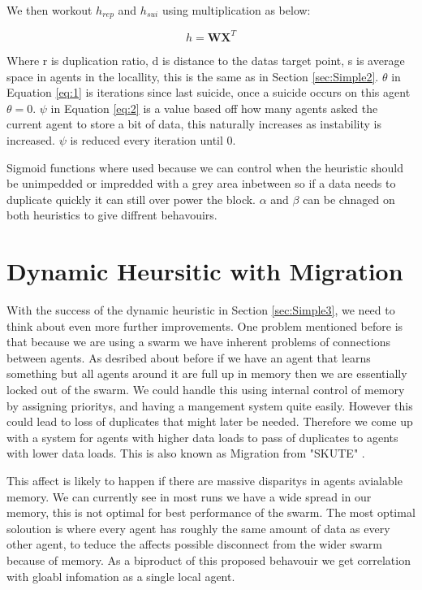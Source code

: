\documentclass{UoYCSproject}
\begin{document}
We then workout $h_{rep}$ and $h_{sui}$ using multiplication as below:

\begin{equation}
 h  = \textbf{W}  \textbf{X} ^{T} 
\end{equation}

Where r is duplication ratio, d is distance to the datas target point, s is average space in agents in the locallity, this is the same as in Section \ref{sec:Simple2}.
$\theta$ in Equation \ref{eq:1} is iterations since last suicide, once a suicide occurs on this agent $\theta=0$.
$\psi$ in Equation \ref{eq:2} is a value based off how many agents asked the current agent to store a bit of data, this naturally increases as instability is increased.
$\psi$ is reduced every iteration until 0.

Sigmoid functions where used because we can control when the heuristic should be unimpedded or impredded with a grey area inbetween so if a data needs to duplicate quickly it can still over power the block.
$\alpha$ and $\beta$ can be chnaged on both heuristics to give diffrent behavouirs.


\section{Dynamic Heursitic with Migration}
\label{sec:Simple4}

With the success of the dynamic heuristic in Section \ref{sec:Simple3}, we need to think about even more further improvements.
One problem mentioned before is that because we are using a swarm we have inherent problems of connections between agents.
As desribed about before if we have an agent that learns something but all agents around it are full up in memory then we are essentially locked out of the swarm.
We could handle this using internal control of memory by assigning prioritys, and having a mangement system quite easily.
However this could lead to loss of duplicates that might later be needed.
Therefore we come up with a system for agents with higher data loads to pass of duplicates to agents with lower data loads.
This is also known as Migration from "SKUTE" \cite{Distributed Storage}.

This affect is likely to happen if there are massive disparitys in agents avialable memory.
We can currently see in most runs we have a wide spread in our memory, this is not optimal for best performance of the swarm.
The most optimal soloution is where every agent has roughly the same amount of data as every other agent, to teduce the affects possible disconnect from the wider swarm because of memory.
As a biproduct of this proposed behavouir we get correlation with gloabl infomation as a single local agent.
\end{document}
